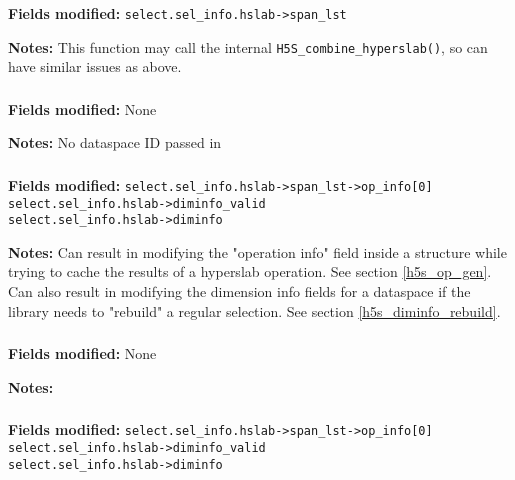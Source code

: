 \documentclass[../HDF5_RFC.tex]{subfiles}
\begin{document}
\subsubsection{}

\textbf{Fields modified:} \texttt{select.sel\_info.hslab->span\_lst}

\textbf{Notes:} This function may call the internal \texttt{H5S\_combine\_hyperslab()}, so can have
similar issues as above.

\subsubsection{}

\textbf{Fields modified:} None

\textbf{Notes:} No dataspace ID passed in

\subsubsection{}

\textbf{Fields modified:} \texttt{select.sel\_info.hslab->span\_lst->op\_info[0]} \\
\texttt{select.sel\_info.hslab->diminfo\_valid} \\
\texttt{select.sel\_info.hslab->diminfo}

\textbf{Notes:} Can result in modifying the "operation info" field inside a structure while trying to
cache the results of a hyperslab operation. See section \ref{h5s_op_gen}. Can also result in modifying
the dimension info fields for a dataspace if the library needs to "rebuild" a regular selection. See
section \ref{h5s_diminfo_rebuild}.

\subsubsection{}

\textbf{Fields modified:} None

\textbf{Notes:}

\subsubsection{}

\textbf{Fields modified:} \texttt{select.sel\_info.hslab->span\_lst->op\_info[0]} \\
\texttt{select.sel\_info.hslab->diminfo\_valid} \\
\texttt{select.sel\_info.hslab->diminfo}
\end{document}
